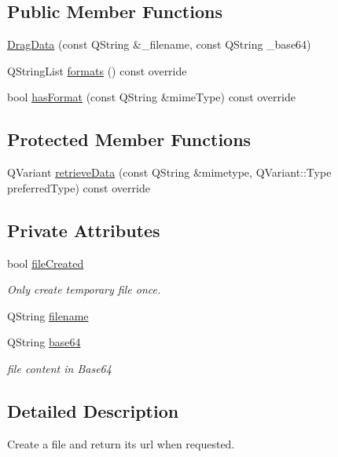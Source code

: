 \subsection*{Public Member Functions}
\begin{DoxyCompactItemize}
\item 
\hyperlink{classDragData_a09c41f96b24d51674b88d17168b33d78}{Drag\+Data} (const Q\+String \&\+\_\+filename, const Q\+String \+\_\+base64)
\item 
Q\+String\+List \hyperlink{classDragData_ae8564afb0c0f5fb2868c39d9a922974e}{formats} () const override
\item 
bool \hyperlink{classDragData_a02f40827e954229013d893ec7c148a96}{has\+Format} (const Q\+String \&mime\+Type) const override
\end{DoxyCompactItemize}
\subsection*{Protected Member Functions}
\begin{DoxyCompactItemize}
\item 
Q\+Variant \hyperlink{classDragData_abb3bb5ffb7ac287fe5c14d5d5a29831d}{retrieve\+Data} (const Q\+String \&mimetype, Q\+Variant\+::\+Type preferred\+Type) const override
\end{DoxyCompactItemize}
\subsection*{Private Attributes}
\begin{DoxyCompactItemize}
\item 
bool \hyperlink{classDragData_a2037ac6c96051425bc5c810f560ebc96}{file\+Created}
\begin{DoxyCompactList}\small\item\em Only create temporary file once. \end{DoxyCompactList}\item 
Q\+String \hyperlink{classDragData_a3ec29e3d1a3a05e44582a724244256f5}{filename}
\item 
Q\+String \hyperlink{classDragData_a96f7b850cb7dfed17dc74057340384e3}{base64}
\begin{DoxyCompactList}\small\item\em file content in Base64 \end{DoxyCompactList}\end{DoxyCompactItemize}


\subsection{Detailed Description}
Create a file and return its url when requested. 

